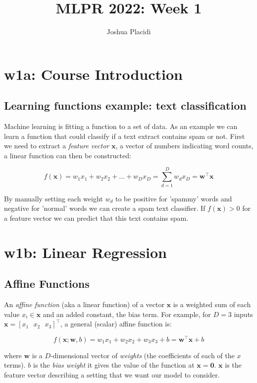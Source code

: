 \documentclass{article}
\title{MLPR 2022: Week 1}
\author{Joshua Placidi}
\begin{document}
\maketitle

\section{w1a: Course Introduction}

\subsection{Learning functions example: text classification}

Machine learning is fitting a function to a set of data.
As an example we can learn a function that could classify if a text extract contains spam or not.
First we need to extract a \emph{feature vector} $\mathbf{x}$, a vector of numbers indicating word counts, a linear function can then be constructed:

\[
f(\mathbf{x}) = w_1 x_1 + w_2 x_2 + \dots + w_D x_D = \sum^{D}_{d=1}w_dx_D = \mathbf{w}^\top\mathbf{x}
\]

By manually setting each weight $w_d$ to be positive for 'spammy' words and negative for 'normal' words we can create a spam text classifier.
If $f(\mathbf{x}) > 0$ for a feature vector we can predict that this text contains spam.


\section{w1b: Linear Regression}

\subsection{Affine Functions}

An \emph{affine function} (aka a linear function) of a vector $\mathbf{x}$ is a weighted sum of each value $x_i \in \mathbf{x}$ and an added constant, the bias term.
For example, for $D=3$ inputs $\mathbf{x} = [x_1 \text{ } x_2 \text{ } x_3]^\top$, a general (scalar) affine function is:

\[
	f(\mathbf{x}; \mathbf{w}, b) = w_1 x_1 + w_2 x_2 + w_3 x_3 + b = \mathbf{w}^\top \mathbf{x} + b
\]

where $\mathbf{w}$ is a $D$-dimensional vector of \emph{weights} (the coefficients of each of the $x$ terms).
$b$ is the \emph{bias weight} it gives the value of the function at $\mathbf{x}=\mathbf{0}$.
$\mathbf{x}$ is the feature vector describing a setting that we want our model to consider.
\end{document}
